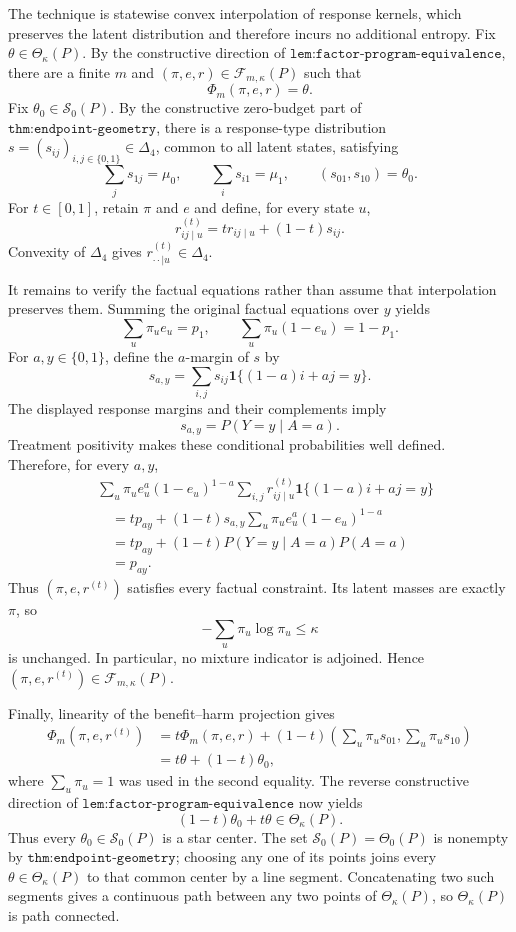 The technique is statewise convex interpolation of response kernels, which preserves the latent distribution and therefore incurs no additional entropy. Fix \(\theta\in\Theta_\kappa(P)\). By the constructive direction of \(\texttt{lem:factor-program-equivalence}\), there are a finite \(m\) and \((\pi,e,r)\in\mathcal F_{m,\kappa}(P)\) such that
\[
\Phi_m(\pi,e,r)=\theta.
\]
Fix \(\theta_0\in\mathcal S_0(P)\). By the constructive zero-budget part of \(\texttt{thm:endpoint-geometry}\), there is a response-type distribution \(s=(s_{ij})_{i,j\in\{0,1\}}\in\Delta_4\), common to all latent states, satisfying
\[
\sum_j s_{1j}=\mu_0,
\qquad
\sum_i s_{i1}=\mu_1,
\qquad
(s_{01},s_{10})=\theta_0.
\]
For \(t\in[0,1]\), retain \(\pi\) and \(e\) and define, for every state \(u\),
\[
r^{(t)}_{ij\mid u}=t r_{ij\mid u}+(1-t)s_{ij}.
\]
Convexity of \(\Delta_4\) gives \(r^{(t)}_{\cdot\cdot\mid u}\in\Delta_4\).

It remains to verify the factual equations rather than assume that interpolation preserves them. Summing the original factual equations over \(y\) yields
\[
\sum_u\pi_u e_u=p_1,
\qquad
\sum_u\pi_u(1-e_u)=1-p_1.
\]
For \(a,y\in\{0,1\}\), define the \(a\)-margin of \(s\) by
\[
s_{a,y}=\sum_{i,j}s_{ij}\mathbf 1\{(1-a)i+aj=y\}.
\]
The displayed response margins and their complements imply
\[
s_{a,y}=P(Y=y\mid A=a).
\]
Treatment positivity makes these conditional probabilities well defined. Therefore, for every \(a,y\),
\[
\begin{aligned}
&\sum_u\pi_u e_u^a(1-e_u)^{1-a}
 \sum_{i,j}r^{(t)}_{ij\mid u}
 \mathbf 1\{(1-a)i+aj=y\}\\
&\quad=t p_{ay}
 +(1-t)s_{a,y}\sum_u\pi_u e_u^a(1-e_u)^{1-a}\\
&\quad=t p_{ay}+(1-t)P(Y=y\mid A=a)P(A=a)\\
&\quad=p_{ay}.
\end{aligned}
\]
Thus \((\pi,e,r^{(t)})\) satisfies every factual constraint. Its latent masses are exactly \(\pi\), so
\[
-\sum_u\pi_u\log\pi_u\leq\kappa
\]
is unchanged. In particular, no mixture indicator is adjoined. Hence \((\pi,e,r^{(t)})\in\mathcal F_{m,\kappa}(P)\).

Finally, linearity of the benefit--harm projection gives
\[
\begin{aligned}
\Phi_m(\pi,e,r^{(t)})
&=t\Phi_m(\pi,e,r)
 +(1-t)\left(\sum_u\pi_u s_{01},\sum_u\pi_u s_{10}\right)\\
&=t\theta+(1-t)\theta_0,
\end{aligned}
\]
where \(\sum_u\pi_u=1\) was used in the second equality. The reverse constructive direction of \(\texttt{lem:factor-program-equivalence}\) now yields
\[
(1-t)\theta_0+t\theta\in\Theta_\kappa(P).
\]
Thus every \(\theta_0\in\mathcal S_0(P)\) is a star center. The set \(\mathcal S_0(P)=\Theta_0(P)\) is nonempty by \(\texttt{thm:endpoint-geometry}\); choosing any one of its points joins every \(\theta\in\Theta_\kappa(P)\) to that common center by a line segment. Concatenating two such segments gives a continuous path between any two points of \(\Theta_\kappa(P)\), so \(\Theta_\kappa(P)\) is path connected.